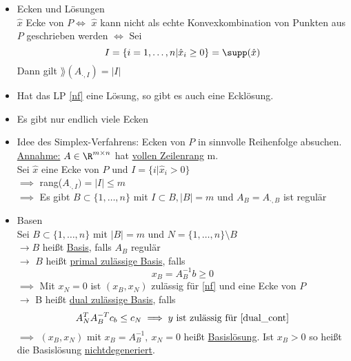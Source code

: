 \begin{itemize}
	\item Ecken und Lösungen\\
		$ \hat{x}$ Ecke von $P \iff$  $ \hat{x}$ kann nicht als echte Konvexkombination von Punkten aus $P$ geschrieben werden
		$\iff$ Sei 
		\begin{equation*}
			I = \{i = 1 ,\dots, n | \hat{x}_{i} \geq 0 \} = \supp(\hat{x})
		\end{equation*} 
		Dann gilt $\rang(A_{\cdot,I})=|I|$
	\item Hat das LP \eqref{nf} eine Lösung, so gibt es auch eine Ecklösung.
	\item Es gibt nur endlich viele Ecken
	\item Idee des Simplex-Verfahrens: Ecken von $P$ in sinnvolle Reihenfolge absuchen.\\
		\underline{Annahme:} $A \in \R^{m \times n }$ hat \underline{vollen Zeilenrang} m. \\
		Sei $\hat{x}$ eine Ecke von $P$ und $I = \{i | \hat{x}_{i}>0\}$ \\
		$\implies$ rang($A_{\cdot,I}   )= |I| \leq m$ \\
		$\implies$ Es gibt $B \subset \{1,\dots,n\}$ mit $I \subset B, |B| = m $ und $A_{B}= A_{\cdot,B}$ ist regulär
	\item Basen\\
		Sei $B \subset \{1,\dots,n\}$ mit $|B|=m$ und $N = \{1,\dots,n\}\setminus B$\\
		$\to B$ heißt \underline{Basis}, falls $A_{B}$ regulär\\
		$\to$ $B$ heißt \underline{primal zulässige Basis}, falls
		\begin{equation*}
			x_{B}=A_{B}^{-1}b \geq 0 
		\end{equation*} $\implies$ Mit $x_{N} = 0$ ist $(x_{B},x_{N})$ zulässig für \eqref{nf} und eine Ecke von $P$ \\
		$\to$ B heißt \underline{dual zulässige Basis}, falls 
		\begin{equation*}
			A_{N}^TA_{B}^{-T}c_{b} \leq c_{N} \implies y \text{ ist zulässig für \eqref{dual_cont}}
		\end{equation*} 
		$\implies$ $\left(x_{B},x_{N} \right)$ mit $x_{B} = A^{-1}_{B},\ x_{N}= 0$ heißt \underline{Basislösung}. Ist $x_{B} > 0 $ so heißt die Basislösung \underline{nichtdegeneriert}.
\end{itemize} 


